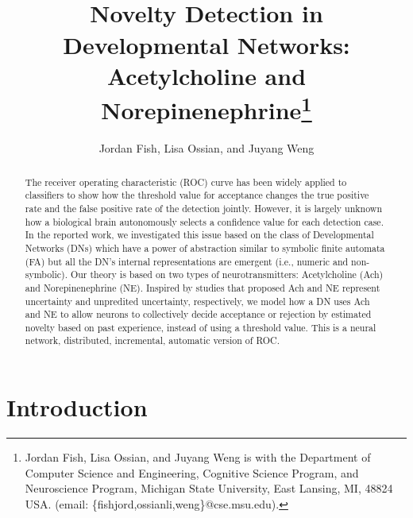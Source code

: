 \documentclass[conference]{IEEEtran}
\begin{document}
\title{\ \\ \LARGE\bf Novelty Detection in Developmental Networks: \\
Acetylcholine and Norepinenephrine\thanks{Jordan Fish, Lisa Ossian, and Juyang Weng is with the Department of Computer Science and Engineering, Cognitive Science Program, and Neuroscience Program, 
Michigan State University, East Lansing, MI, 48824 USA. (email: \{fishjord,ossianli,weng\}@cse.msu.edu).}}

\author{Jordan Fish, Lisa Ossian, and Juyang Weng}


\maketitle

\begin{abstract}
The receiver operating characteristic (ROC) 
curve has been widely applied to classifiers to show how the threshold value for acceptance changes the true positive rate and 
the false positive rate of the detection jointly.  However, it is largely unknown how a biological brain autonomously selects a confidence value for each detection case.  In the reported work, we investigated this issue based on the class of Developmental Networks (DNs) which have a power of
abstraction similar to symbolic finite automata (FA)
but all the DN's internal representations are emergent
(i.e., numeric and non-symbolic).  Our theory is based on two types of neurotransmitters: Acetylcholine (Ach) and Norepinenephrine (NE).  Inspired by studies that
proposed Ach and NE represent uncertainty and 
unpredited uncertainty, respectively, we model how a DN uses 
Ach and NE to allow neurons to collectively decide acceptance or rejection by estimated 
novelty based on past experience, instead of using a threshold value.   This is a neural network, 
distributed, incremental, automatic version of ROC. 
\end{abstract}


\section{Introduction}
\end{document}
